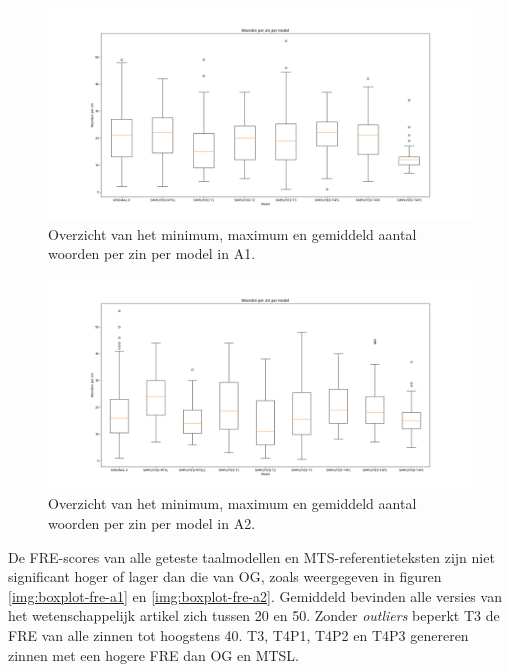 \begin{figure}[H]
	\includegraphics[width=\linewidth]{img/boxplot-avg-a1.png}
	\caption{Overzicht van het minimum, maximum en gemiddeld aantal woorden per zin per model in A1.}
	\label{img:boxplot-min-max-avg-words-a1}
\end{figure}

\begin{figure}[H]
	\includegraphics[width=\linewidth]{img/boxplot-avg-a2.png}
	\caption{Overzicht van het minimum, maximum en gemiddeld aantal woorden per zin per model in A2.}
	\label{img:boxplot-min-max-avg-words-a2}
\end{figure}

De FRE-scores van alle geteste taalmodellen en MTS-referentieteksten zijn niet significant hoger of lager dan die van OG, zoals weergegeven in figuren \ref{img:boxplot-fre-a1} en \ref{img:boxplot-fre-a2}. Gemiddeld bevinden alle versies van het wetenschappelijk artikel zich tussen 20 en 50. Zonder \textit{outliers} beperkt T3 de FRE van alle zinnen tot hoogstens 40. T3, T4P1, T4P2 en T4P3 genereren zinnen met een hogere FRE dan OG en MTSL. 

